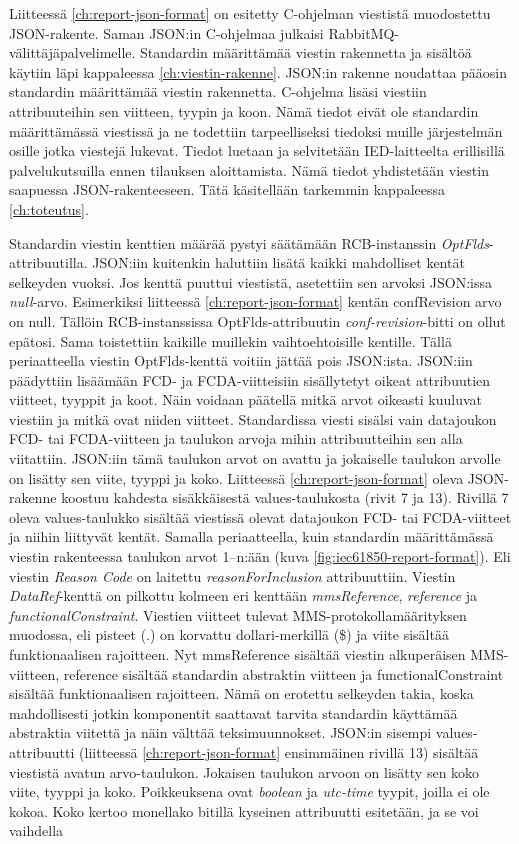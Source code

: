 Liitteessä \ref{ch:report-json-format} on esitetty C-ohjelman viestistä muodostettu JSON-rakente. Saman JSON:in C-ohjelmaa julkaisi RabbitMQ-välittäjäpalvelimelle. Standardin määrittämää viestin rakennetta ja sisältöä käytiin läpi kappaleessa \ref{ch:viestin-rakenne}. JSON:in rakenne noudattaa pääosin standardin määrittämää viestin rakennetta. C-ohjelma lisäsi viestiin attribuuteihin sen viitteen, tyypin ja koon. Nämä tiedot eivät ole standardin määrittämässä viestissä ja ne todettiin tarpeelliseksi tiedoksi muille järjestelmän osille jotka viestejä lukevat. Tiedot luetaan ja selvitetään IED-laitteelta erillisillä palvelukutsuilla ennen tilauksen aloittamista. Nämä tiedot yhdistetään viestin saapuessa JSON-rakenteeseen. Tätä käsitellään tarkemmin kappaleessa \ref{ch:toteutus}.

Standardin viestin kenttien määrää pystyi säätämään RCB-instanssin \emph{OptFlds}-attribuutilla. JSON:iin kuitenkin haluttiin lisätä kaikki mahdolliset kentät selkeyden vuoksi. Jos kenttä puuttui viestistä, asetettiin sen arvoksi JSON:issa \emph{null}-arvo. Esimerkiksi liitteessä \ref{ch:report-json-format} kentän confRevision arvo on null. Tällöin RCB-instanssissa OptFlds-attribuutin \emph{conf-revision}-bitti on ollut epätosi. Sama toistettiin kaikille muillekin vaihtoehtoisille kentille. Tällä periaatteella viestin OptFlds-kenttä voitiin jättää pois JSON:ista. JSON:iin päädyttiin lisäämään FCD- ja FCDA-viitteisiin sisällytetyt oikeat attribuutien viitteet, tyyppit ja koot. Näin voidaan päätellä mitkä arvot oikeasti kuuluvat viestiin ja mitkä ovat niiden viitteet. Standardissa viesti sisälsi vain datajoukon FCD- tai FCDA-viitteen ja taulukon arvoja mihin attribuutteihin sen alla viitattiin. JSON:iin tämä taulukon arvot on avattu ja jokaiselle taulukon arvolle on lisätty sen viite, tyyppi ja koko. Liitteessä \ref{ch:report-json-format} oleva JSON-rakenne koostuu kahdesta sisäkkäisestä values-taulukosta (rivit 7 ja 13). Rivillä 7 oleva values-taulukko sisältää viestissä olevat datajoukon FCD- tai FCDA-viitteet ja niihin liittyvät kentät. Samalla periaatteella, kuin standardin määrittämässä viestin rakenteessa taulukon arvot 1--n:ään (kuva \ref{fig:iec61850-report-format}). Eli viestin \emph{Reason Code} on laitettu \emph{reasonForInclusion} attribuuttiin. Viestin \emph{DataRef}-kenttä on pilkottu kolmeen eri kenttään \emph{mmsReference}, \emph{reference} ja \emph{functionalConstraint}. Viestien viitteet tulevat MMS-protokollamäärityksen muodossa, eli pisteet (.) on korvattu dollari-merkillä (\$) ja viite sisältää funktionaalisen rajoitteen. Nyt mmsReference sisältää viestin alkuperäisen MMS-viitteen, reference sisältää standardin abstraktin viitteen ja functionalConstraint sisältää funktionaalisen rajoitteen. Nämä on erotettu selkeyden takia, koska mahdollisesti jotkin komponentit saattavat tarvita standardin käyttämää abstraktia viitettä ja näin välttää teksimuunnokset. JSON:in sisempi values-attribuutti (liitteessä \ref{ch:report-json-format} ensimmäinen rivillä 13) sisältää viestistä avatun arvo-taulukon. Jokaisen taulukon arvoon on lisätty sen koko viite, tyyppi ja koko. Poikkeuksena ovat \emph{boolean} ja \emph{utc-time} tyypit, joilla ei ole kokoa. Koko kertoo monellako bitillä kyseinen attribuutti esitetään, ja se voi vaihdella 